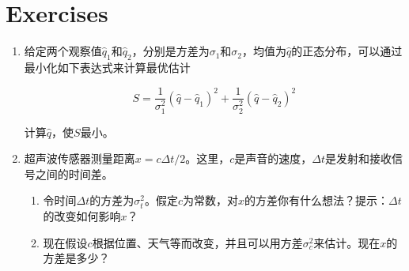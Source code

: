 \section*{Exercises}\small
\begin{enumerate}

\item 给定两个观察值$\hat{q}_1$和$\hat{q}_2$，分别是方差为$\sigma_1$和$\sigma_2$，均值为$\hat{q}$的正态分布，可以通过最小化如下表达式来计算最优估计

\begin{equation}
\nonumber
S=\frac{1}{\sigma_1^2}(\hat{q}-\hat{q}_1)^2+\frac{1}{\sigma_2^2}(\hat{q}-\hat{q}_2)^2
\end{equation}

计算$\hat{q}$，使$S$最小。


\item 超声波传感器测量距离$x=c\Delta t/2$。这里，$c$是声音的速度，$\Delta t$是发射和接收信号之间的时间差。

\begin{enumerate}

\item 令时间$\Delta t$的方差为$\sigma_t^2$。假定$c$为常数，对$x$的方差你有什么想法？提示：$\Delta t$的改变如何影响$x$？
\item 现在假设$c$根据位置、天气等而改变，并且可以用方差$\sigma_c^2$来估计。现在$x$的方差是多少？
\end{enumerate}


\end{enumerate}
